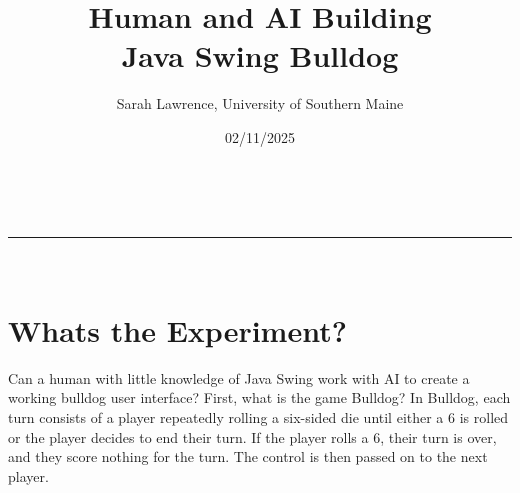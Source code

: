 \documentclass[a4paper,11pt]{article}
\makeatletter
\newcommand{\linia}{\rule{\linewidth}{0.5pt}}
\renewcommand{\maketitle}{
\begin{center}
\vspace{2ex}
{\huge \textsc{\@title}}
\vspace{1ex}
\\
\linia\\
\@author \hfill \@date
\vspace{4ex}
\end{center}
}
\makeatother
\begin{document}
\title{Human and AI Building \\Java Swing Bulldog}

\author{Sarah Lawrence, University of Southern Maine}

\date{02/11/2025}

\maketitle

\section*{Whats the Experiment?}
Can a human with little knowledge of Java Swing work with AI to create a working bulldog user interface? First, what is the game Bulldog? In Bulldog, each turn consists of a player repeatedly rolling a six-sided die until either a 6 is rolled or the player decides to end their turn. If the player rolls a 6, their turn is over, and they score nothing for the turn. The control is then passed on to the next player.
\end{document}
